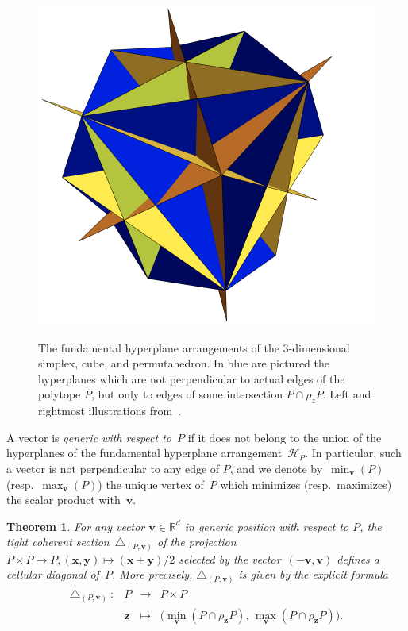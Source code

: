 \documentclass{amsart}
\newcommand{\darkblue}{\color{darkblue}} %
\newtheorem{theorem}{Theorem}[section]
\theoremstyle{definition}
\newcommand{\R}{\mathbb{R}} %
\renewcommand{\b}[1]{{\boldsymbol{#1}}} %
\newcommand{\resp}{resp.~} %
\newcommand{\defn}[1]{\textsl{\darkblue #1}} %
\renewcommand{\b}[1]{\boldsymbol{#1}} %
\begin{document}
\begin{figure}[p]
{		\includegraphics[scale=.3]{HypPermuto.png}
	}
	\caption{The fundamental hyperplane arrangements of the $3$-dimensional simplex, cube, and permutahedron. In blue are pictured the hyperplanes which are not perpendicular to actual edges of the polytope $P$, but only to edges of some intersection $P\cap \rho_z P$. Left and rightmost illustrations from~\cite[Fig.~12]{LaplanteAnfossi}.}
	\label{fig:examplesHyperplanes}
\end{figure}

A vector is \defn{generic with respect to~$P$} if it does not belong to the union of the hyperplanes of the fundamental hyperplane arrangement~$\mathcal{H}_P$.
In particular, such a vector is not perpendicular to any edge of $P$, and we denote by~$\min_{\b{v}}(P)$ (\resp $\max_{\b{v}}(P)$) the unique vertex of~$P$ which minimizes (\resp maximizes) the scalar product with~$\b{v}$. 

\begin{theorem}
\label{thm:diagonal}
For any vector $\b{v} \in \R^d$ in generic position with respect to $P$, the tight coherent section~$\triangle_{(P,\b{v})}$ of the projection $P \times P \to P, (\b{x}, \b{y}) \mapsto (\b{x}+\b{y})/2$ selected by the vector~$(-\b{v}, \b{v})$ defines a cellular diagonal of~$P$.
More precisely, $\triangle_{(P,\b{v})}$ is given by the explicit formula
\begin{align*}
	\begin{array}{rlcl}
		\triangle_{(P,\b{v})}\ : & P & \to & P\times P \\
		& \b{z} & \mapsto & \bigl( \min_{\b{v}}(P\cap \rho_{\b{z}} P), \, \max_{\b{v}}(P\cap \rho_{\b{z}} P) \bigr) .
	\end{array}
\end{align*}
\end{theorem}
\end{document}
